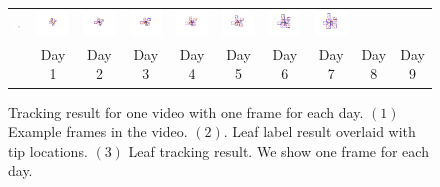 \begin{figure}
\begin{centering}
\begin{tabular}{c c@{} c@{} c@{} c@{} c@{} c@{} c@{} c@{} c@{}}
\includegraphics[trim= 100 70 120 10, clip, width=.1\textwidth]{Figures/trackExample/3_2.pdf}&
\includegraphics[trim= 100 70 120 10, clip, width=.1\textwidth]{Figures/trackExample/3_3.pdf}&
\includegraphics[trim= 100 70 120 10, clip, width=.1\textwidth]{Figures/trackExample/3_4.pdf}&
\includegraphics[trim= 100 70 120 10, clip, width=.1\textwidth]{Figures/trackExample/3_5.pdf}&
\includegraphics[trim= 100 70 120 10, clip, width=.1\textwidth]{Figures/trackExample/3_6.pdf}&
\includegraphics[trim= 100 70 120 10, clip, width=.1\textwidth]{Figures/trackExample/3_7.pdf}&
\includegraphics[trim= 100 70 120 10, clip, width=.1\textwidth]{Figures/trackExample/3_8.pdf}&
\includegraphics[trim= 100 70 120 10, clip, width=.1\textwidth]{Figures/trackExample/3_9.pdf}\\

& Day 1 & Day 2 & Day 3 & Day 4 & Day 5 & Day 6 & Day 7 & Day 8 & Day 9 \\
\end{tabular}
\caption{Tracking result for one video with one frame for each day. $(1)$ Example frames in the video. $(2)$. Leaf label result overlaid with tip locations. $(3)$ Leaf tracking result. We show one frame for each day. }
\label{fig:trackExample}
\end{centering}
\end{figure}


